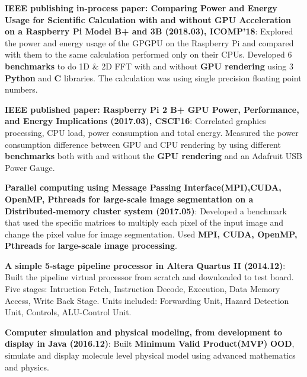 \documentclass[letterpaper,11pt]{article}
\newcommand{\resumeItem}[2]{
  \item\small{
    \textbf{#1}{: #2 \vspace{-2pt}}
  }
}
\newcommand{\resumeSubItem}[2]{\resumeItem{#1}{#2}\vspace{-4pt}}
\begin{document}
    \resumeSubItem{IEEE publishing in-process paper: Comparing Power and Energy Usage for Scientific Calculation with and without GPU Acceleration on a Raspberry Pi Model B+ and 3B (2018.03), ICOMP'18}
        {Explored the power and energy usage of the GPGPU on the Raspberry Pi and compared with them to the same calculation performed only on their CPUs. Developed 6 \textbf{benchmarks} to do 1D \& 2D FFT with and without \textbf{GPU rendering} using 3 \textbf{Python} and \textbf{C} libraries. The calculation was using single precision floating point numbers.}
    
    \resumeSubItem{IEEE published paper: Raspberry Pi 2 B+ GPU Power, Performance, and Energy Implications (2017.03), CSCI'16}
        {Correlated graphics processing, CPU load, power consumption and total energy. Measured the power consumption difference between GPU and CPU rendering by using different \textbf{benchmarks} both with and without the \textbf{GPU rendering} and an Adafruit USB Power Gauge.}
    
    \resumeSubItem{Parallel computing using Message Passing Interface(MPI),CUDA, OpenMP, Pthreads for large-scale image segmentation on a Distributed-memory cluster system (2017.05)}
        {Developed a benchmark that used the specific matrices to multiply each pixel of the input image and change the pixel value for image segmentation. Used \textbf{MPI, CUDA, OpenMP, Pthreads} for \textbf{large-scale image processing}.}

    \resumeSubItem{A simple 5-stage pipeline processor in Altera Quartus II (2014.12)}
        {Built the pipeline virtual processor from scratch and downloaded to test board. Five stages: Intruction Fetch, Instruction Decode, Execution, Data Memory Access, Write Back Stage. Units included: Forwarding Unit, Hazard Detection Unit, Controls, ALU-Control Unit.}
    
    \resumeSubItem{Computer simulation and physical modeling, from development to display in Java (2016.12)}
        {Built \textbf{Minimum Valid Product(MVP)} \textbf{OOD}, simulate and display molecule level physical model using advanced mathematics and physics.}
    
    
\end{document}
